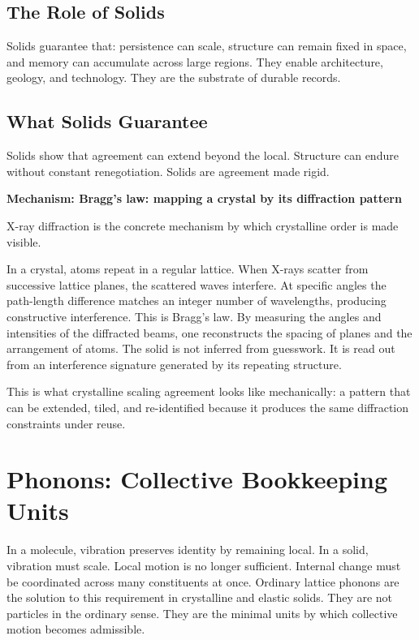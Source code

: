 \documentclass[11pt,twoside,openright]{book}
\newenvironment{mechanismbox}[1]
  {\begin{framed}\noindent\textbf{Mechanism: #1}\par\medskip}
  {\end{framed}}
\begin{document}
\section*{The Role of Solids}

Solids guarantee that: persistence can scale, structure can remain fixed in space, and memory can accumulate across large regions. They enable architecture, geology, and technology. They are the substrate of durable records.

\section*{What Solids Guarantee}

Solids show that agreement can extend beyond the local. Structure can endure without constant renegotiation. Solids are agreement made rigid.

\begin{mechanismbox}{Bragg's law: mapping a crystal by its diffraction pattern}
X-ray diffraction is the concrete mechanism by which crystalline order is made visible.

In a crystal, atoms repeat in a regular lattice. When X-rays scatter from successive lattice planes, the scattered waves interfere. At specific angles the path-length difference matches an integer number of wavelengths, producing constructive interference. This is Bragg's law. By measuring the angles and intensities of the diffracted beams, one reconstructs the spacing of planes and the arrangement of atoms. The solid is not inferred from guesswork. It is read out from an interference signature generated by its repeating structure.

This is what crystalline scaling agreement looks like mechanically:
a pattern that can be extended, tiled, and re-identified because it produces the same diffraction constraints under reuse.
\end{mechanismbox}

\chapter{Phonons: Collective Bookkeeping Units}

In a molecule, vibration preserves identity by remaining local. In a solid, vibration must scale. Local motion is no longer sufficient. Internal change must be coordinated across many constituents at once. Ordinary lattice phonons are the solution to this requirement in crystalline and elastic solids. They are not particles in the ordinary sense. They are the minimal units by which collective motion becomes admissible.
\end{document}
